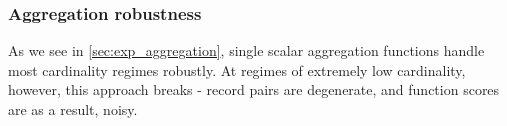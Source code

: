 \subsubsection{Aggregation robustness}
As we see in \ref{sec:exp_aggregation}, single scalar aggregation functions handle most cardinality regimes robustly. At regimes of extremely low cardinality, however, this approach breaks - record pairs are degenerate, and function scores are as a result, noisy.




